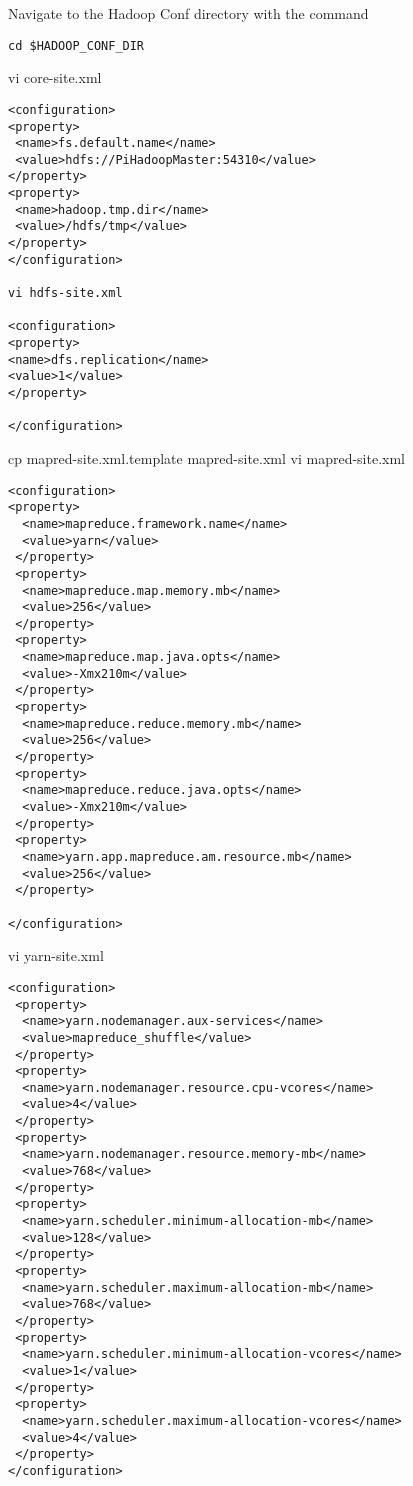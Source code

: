 Navigate to the Hadoop Conf directory with the command

\begin{lstlisting}
cd $HADOOP_CONF_DIR
\end{lstlisting}

vi core-site.xml

\begin{lstlisting}
<configuration>
<property>
 <name>fs.default.name</name>
 <value>hdfs://PiHadoopMaster:54310</value>
</property>
<property>
 <name>hadoop.tmp.dir</name>
 <value>/hdfs/tmp</value>
</property>
</configuration>

vi hdfs-site.xml

<configuration>
<property>
<name>dfs.replication</name>
<value>1</value>
</property>

</configuration>
\end{lstlisting}

cp mapred-site.xml.template mapred-site.xml vi mapred-site.xml

\begin{lstlisting}
<configuration>
<property>
  <name>mapreduce.framework.name</name>
  <value>yarn</value>
 </property>
 <property>
  <name>mapreduce.map.memory.mb</name>
  <value>256</value>
 </property>
 <property>
  <name>mapreduce.map.java.opts</name>
  <value>-Xmx210m</value>
 </property>
 <property>
  <name>mapreduce.reduce.memory.mb</name>
  <value>256</value>
 </property>
 <property>
  <name>mapreduce.reduce.java.opts</name>
  <value>-Xmx210m</value>
 </property>
 <property>
  <name>yarn.app.mapreduce.am.resource.mb</name>
  <value>256</value>
 </property>

</configuration>
\end{lstlisting}

vi yarn-site.xml

\begin{lstlisting}
<configuration>
 <property>
  <name>yarn.nodemanager.aux-services</name>
  <value>mapreduce_shuffle</value>
 </property>
 <property>
  <name>yarn.nodemanager.resource.cpu-vcores</name>
  <value>4</value>
 </property>
 <property>
  <name>yarn.nodemanager.resource.memory-mb</name>
  <value>768</value>
 </property>
 <property>
  <name>yarn.scheduler.minimum-allocation-mb</name>
  <value>128</value>
 </property>
 <property>
  <name>yarn.scheduler.maximum-allocation-mb</name>
  <value>768</value>
 </property>
 <property>
  <name>yarn.scheduler.minimum-allocation-vcores</name>
  <value>1</value>
 </property>
 <property>
  <name>yarn.scheduler.maximum-allocation-vcores</name>
  <value>4</value>
 </property>
</configuration>
\end{lstlisting}

